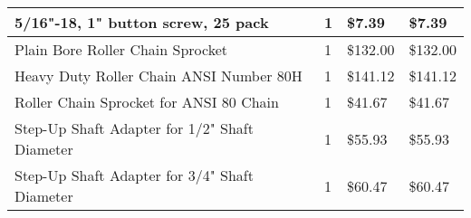 \begin{longtable}[H]{| L{8.0cm} | P{1.25cm} | P{2.0cm} | P{2.0cm} |}
5/16"-18, 1" button screw, 25 pack  	&1	    &\$7.39	&\$7.39         \\\hline
Plain Bore Roller Chain Sprocket        &1	    &\$132.00
&\$132.00       \\\hline
Heavy Duty Roller Chain ANSI Number 80H &1	    &\$141.12	&\$141.12   \\\hline
Roller Chain Sprocket for ANSI 80 Chain &1	    &\$41.67
&\$41.67        \\\hline
Step-Up Shaft Adapter for 1/2" Shaft Diameter &1	    &\$55.93	&\$55.93        \\\hline
Step-Up Shaft Adapter for 3/4" Shaft Diameter &1	    &\$60.47	&\$60.47        \\\hline


\end{longtable}

\begin{comment}

TOTAL = \$11,175.72

\end{comment}